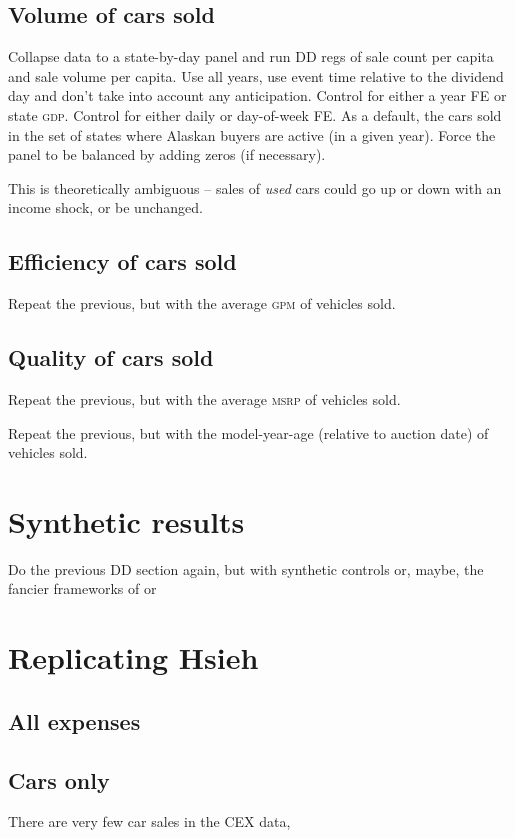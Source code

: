 \documentclass[11pt,letterpaper,oneside]{article}
\newcommand{\gpm}{\textsc{gpm}}
\newcommand{\msrp}{\textsc{msrp}}
\newcommand{\gdp}{\textsc{gdp}}
\begin{document}
\subsection{Volume of cars sold}
Collapse data to a state-by-day panel and run DD regs of sale count per capita and sale volume per capita.
Use all years, use event time relative to the dividend day and don't take into account any anticipation.
Control for either a year FE or state \gdp{}. Control for either daily or day-of-week FE.
As a default, the cars sold in the set of states where Alaskan buyers are active (in a given year).
Force the panel to be balanced by adding zeros (if necessary).

This is theoretically ambiguous -- sales of \emph{used} cars could go up or down with an income shock, or be unchanged.

\subsection{Efficiency of cars sold}
Repeat the previous, but with the average \gpm{} of vehicles sold.

\subsection{Quality of cars sold}
Repeat the previous, but with the average \msrp{} of vehicles sold.

Repeat the previous, but with the model-year-age (relative to auction date) of vehicles sold.


\section{Synthetic results}
Do the previous DD section again, but with synthetic controls or, maybe, the fancier frameworks of
\textcite{DoudchenkoImbens2016DD} or \textcite{Xu2016}




\section{Replicating Hsieh}

\subsection{All expenses}
\subsection{Cars only}

There are very few car sales in the CEX data,





\pagebreak
\printbibliography
\end{document}
